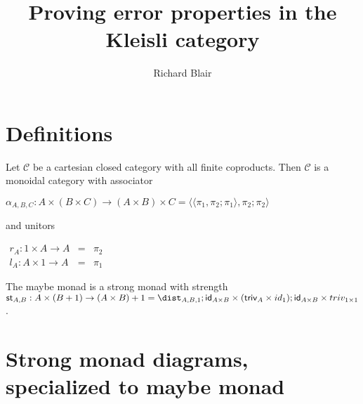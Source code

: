 \documentclass{article}[12pt]
\begin{document}
\let\mto\to                     %
\let\to\relax
\newcommand{\to}{\rightarrow}
\newcommand{\cat}[1]{\mathcal{#1}}

\newcommand{\id}[0]{\mathsf{id}}
\newcommand{\st}[0]{\mathsf{st}}
\newcommand{\triv}[0]{\mathsf{triv}}

\title{Proving error properties in the Kleisli category}

\author{Richard Blair}

\maketitle

\section{Definitions}
Let $\cat{C}$ be a cartesian closed category with all finite coproducts.
Then $\cat{C}$ is a monoidal category with associator
\begin{center}
  \begin{math}
    \alpha_{A,B,C} : A \times (B \times C) \mto (A \times B) \times C = \langle \langle \pi_1 , \pi_2 ; \pi_1 \rangle , \pi_2 ; \pi_2 \rangle
  \end{math}
\end{center}
and unitors
\begin{center}
  \begin{math}
  \begin{array}{rll}
    r_A : 1 \times A \mto A & = & \pi_2 \\
    l_A : A \times 1 \mto A & = & \pi_1
  \end{array}
  \end{math}
\end{center}

\begin{theorem}
  The maybe monad is a strong monad with strength $\st_{A,B} : A \times (B + 1) \mto (A \times B) + 1 = \dist_{A,B,1};\id_{A \times B} \times (\triv_A \times id_1);\id_{A \times B} \times triv_{1 \times 1}$.
\end{theorem}

\section{Strong monad diagrams, specialized to maybe monad}
\end{document}
